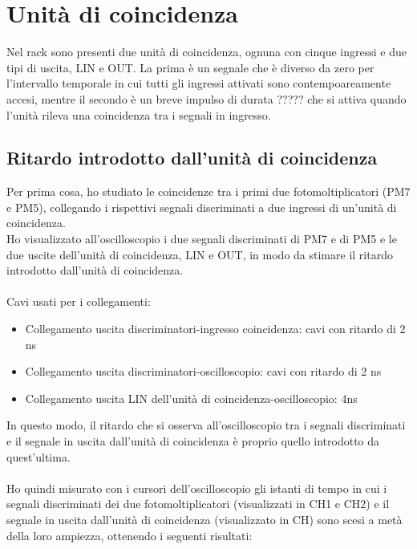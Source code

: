 \documentclass{article}
\begin{document}
\section{Unità di coincidenza}
Nel rack sono presenti due unità di coincidenza, ognuna con cinque ingressi e due tipi di uscita, LIN e OUT. 
La prima è un segnale che è diverso da zero per l'intervallo temporale in cui tutti gli ingressi attivati sono contempoareamente accesi, mentre il secondo è un breve impulso di durata ????? che si attiva quando l'unità rileva una coincidenza tra i segnali in ingresso. 

\subsection{Ritardo introdotto dall'unità di coincidenza}
Per prima cosa, ho studiato le coincidenze tra i primi due fotomoltiplicatori (PM7 e PM5), collegando i rispettivi segnali discriminati a due ingressi di un'unità di coincidenza.\\
Ho visualizzato all'oscilloscopio i due segnali discriminati di PM7 e di PM5 e le due uscite dell'unità di coincidenza, LIN e OUT, in modo da stimare il ritardo introdotto dall'unità di coincidenza. 
\\
\\
Cavi usati per i collegamenti: 
\begin{itemize}
    \item Collegamento uscita discriminatori-ingresso coincidenza: cavi con ritardo di 2 ns
    \item Collegamento uscita discriminatori-oscilloscopio: cavi con ritardo di 2 ns
     \item Collegamento uscita LIN dell'unità di coincidenza-oscilloscopio: 4ns
\end{itemize}
In questo modo, il ritardo che si osserva all'oscilloscopio tra i segnali discriminati e il segnale in uscita dall'unità di coincidenza è proprio quello introdotto da quest'ultima. 
\\
\\
Ho quindi misurato con i cursori dell'oscilloscopio gli istanti di tempo in cui i segnali discriminati dei due fotomoltiplicatori (visualizzati in CH1 e CH2) e il segnale in uscita dall'unità di coincidenza (visualizzato in CH) sono scesi a metà della loro ampiezza, ottenendo i seguenti risultati: 
\end{document}
